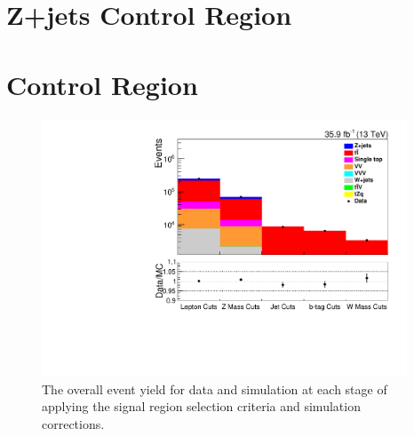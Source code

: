 \section{Z+jets Control Region}\label{appSec:zPlusControlRegionPlots}

\clearpage
\newpage
\section{\ttbar Control Region}\label{appSec:ttbarControlRegionPlots}

\begin{figure}[ht]
\centering
\includegraphics[width=0.97\textwidth]{figs/background-estimation/plots/unblinded/ttbar_control/cutFlow_log.pdf}
\caption{
The overall event yield for data and simulation at each stage of applying the signal region selection criteria and simulation corrections.
}
\label{fig:ttbar_cutFlow}
\end{figure}

